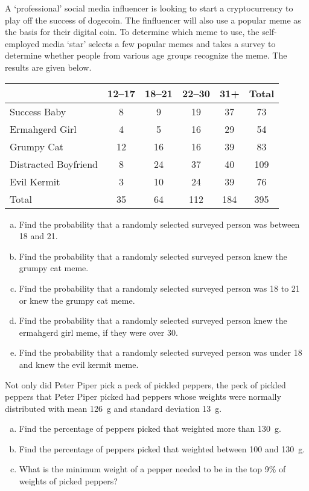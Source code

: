 \documentclass[12pt,letterpaper]{exam}
\begin{document}
\begin{questions}
\newpage
\question[15] A `professional' social media influencer is looking to start a cryptocurrency to play off the success of dogecoin. The finfluencer will also use a popular meme as the basis for their digital coin. To determine which meme to use, the self-employed media `star' selects a few popular memes and takes a survey to determine whether people from various age groups recognize the meme. The results are given below. 
	\begin{table}[h]
	\centering
	\begin{tabular}{|l||c|c|c|c||c|} \hline
	& 12--17 & 18--21 & 22--30 & 31+ & Total \\ \hline \hline
	Success Baby & 8 & 9 & 19 & 37 & 73 \\ \hline
	Ermahgerd Girl & 4 & 5 & 16 & 29 & 54 \\ \hline
	Grumpy Cat & 12 & 16 & 16 & 39 & 83 \\ \hline
	Distracted Boyfriend & 8 & 24 & 37 & 40 & 109 \\ \hline
	Evil Kermit & 3 & 10 & 24 & 39 & 76 \\ \hline \hline
	Total & 35 & 64 & 112 & 184 & 395 \\ \hline
	\end{tabular}
	\end{table}

\begin{enumerate}[(a)]
\item Find the probability that a randomly selected surveyed person was between 18 and 21. 
\item Find the probability that a randomly selected surveyed person knew the grumpy cat meme.
\item Find the probability that a randomly selected surveyed person was 18 to 21 or knew the grumpy cat meme. 
\item Find the probability that a randomly selected surveyed person knew the ermahgerd girl meme, if they were over 30.   
\item Find the probability that a randomly selected surveyed person was under 18 and knew the evil kermit meme. 
\end{enumerate}



\newpage
\question[15] Not only did Peter Piper pick a peck of pickled peppers, the peck of pickled peppers that Peter Piper picked had peppers whose weights were normally distributed with mean 126~g and standard deviation 13~g. 
	\begin{enumerate}[(a)]
	\item Find the percentage of peppers picked that weighted more than 130~g. 
	\item Find the percentage of peppers picked that weighted between 100 and 130~g. 
	\item What is the minimum weight of a pepper needed to be in the top 9\% of weights of picked peppers?
	\end{enumerate}




\end{questions}
\end{document}
